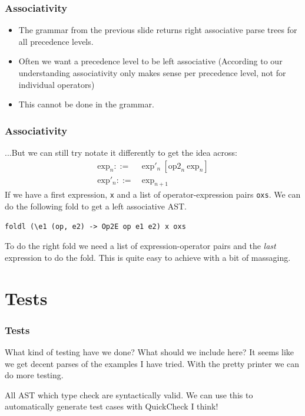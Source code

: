 \documentclass{beamer}
\begin{document}
\begin{frame}[fragile]
\frametitle{Associativity}
\begin{itemize}
\item The grammar from the previous slide returns right associative parse trees for all precedence levels.
\item Often we want a precedence level to be left associative (According to our understanding associativity only makes sense per precedence level, not for individual operators)
\item This cannot be done in the grammar.
\end{itemize}
\end{frame}
\begin{frame}[fragile]
\frametitle{Associativity}
...But we can still try notate it differently to get the idea across:
\begin{align*}
\text{exp}_n ::=&\ \text{exp}'_n\ [ \text{op2}_n\ \text{exp}_n ] \\
\text{exp}'_n ::=&\ \text{exp}_{n+1} 
\end{align*}
If we have a first expression, \lstinline{x} and a list of operator-expression pairs \lstinline{oxs}. We can do the following fold to get a left associative AST.
\begin{lstlisting}
foldl (\e1 (op, e2) -> Op2E op e1 e2) x oxs
\end{lstlisting}

To do the right fold we need a list of expression-operator pairs and the \emph{last} expression to do the fold. This is quite easy to achieve with a bit of massaging. 
\end{frame}

\section{Tests}
\begin{frame}
\frametitle{Tests}

What kind of testing have we done? What should we include here? It seems like we get decent parses of the examples I have tried. With the pretty printer we can do more testing.

All AST which type check are syntactically valid. We can use this to automatically generate test cases with QuickCheck I think!
\end{frame}
\end{document}
